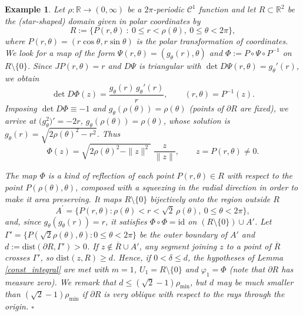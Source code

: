 \documentclass[a4paper,12pt]{amsart}
\newtheorem{ex}[theorem]{Example}
\newcommand{\eproof}{\hfill \mbox{${\square}$}}
\newcommand{\R}{\mathbb{R}}
\newcommand{\dist}{\textrm{dist}}
\begin{document}
   \begin{ex} \label{ex_starshaped}
   {Let $\rho: \R \to (0,\infty)$ be a $2\pi$-periodic $\mathcal{C}^1$ function and let
   $R \subset \R^2$ be the (star-shaped) domain given in polar coordinates by}
   $$ R :=  {\{ P(r, \theta) \ : \   0 \leq  r  <  \rho(\theta),\ 0  \leq  \theta < 2 \pi\}}, $$
    where $ P(r, \theta) = (r \cos \theta, r \sin \theta)$ is the polar transformation of coordinates.
    {We look for a map of the form $\Psi(r,\theta) = (g_\theta(r), \theta)$ and
    $\Phi := P \circ \Psi \circ P^{-1}$ on $R \setminus\{0\}$.
    Since $JP(r,\theta) = r$ and $D\Psi$ is triangular with $\det D\Psi(r,\theta) = g_\theta'(r)$, we obtain
    \[ \det D\Phi(z) = \frac{g_\theta(r)\, g_\theta'(r)}{r}, \qquad (r,\theta) = P^{-1}(z).\]
    Imposing $\det D\Phi \equiv -1$ and $g_\theta(\rho(\theta)) = \rho(\theta)$ (points of $\partial R$ are fixed), we arrive at
    $\big(g_\theta^2\big)' = -2r$, $g_\theta(\rho(\theta)) = \rho(\theta)$, whose solution is
    $g_\theta(r) = \sqrt{2\rho(\theta)^2 - r^2}$. Thus
    \[ \Phi(z) = \sqrt{2 \rho(\theta)^2 - \|z\|^2}\; \frac{z}{\|z\|}, \qquad z = P(r,\theta) \neq 0 .\]}

  The map $\Phi$ is a kind of reflection of each point {$P(r,\theta) \in R$} with respect to the point {$P(\rho(\theta),\theta)$}, composed with a squeezing in the radial direction in order to make it area preserving.
   {It maps $R \setminus \{0\}$ bijectively onto the region outside $R$
     $$ A^{\prime} = \{P(r, \theta) :  \rho(\theta) <  r <  \sqrt{2}\,   \rho(\theta) , \ 0 \leq \theta < 2 \pi \}, $$
 and, since $g_\theta(g_\theta(r)) = r$, it satisfies $\Phi \circ \Phi = \mathrm{id}$ on $(R\setminus\{0\}) \cup A'$.}
 {Let $\Gamma' = \{P(\sqrt 2\rho(\theta),\theta) : 0 \leq \theta < 2\pi\}$ be the outer boundary of $A'$ and
 $d := \dist(\partial R, \Gamma') > 0$. If $z \notin \overline{R} \cup A'$, any segment joining $z$ to a point of $\overline R$ crosses $\Gamma'$, so $\dist(z, R) \geq d$. Hence,
  if $0 < \delta \leq d$, the hypotheses of Lemma \ref{const_integral} are met with  $m=1$, $U_1 = R \setminus\{0\}$ and  $\varphi_1 = \Phi$ (note that $\partial R$ has measure zero).
  We remark that $d \leq (\sqrt2 - 1)\rho_{\min}$, but $d$ may be much smaller than $(\sqrt2-1)\rho_{\min}$ if $\partial R$ is very oblique with respect to the rays through the origin.} \eproof
    \end{ex}
\end{document}
